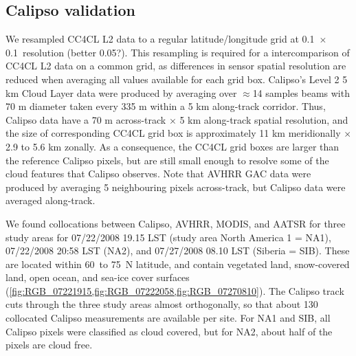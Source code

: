 \subsection{Calipso validation}\label{sec:calipso_method}

We resampled CC4CL L2 data to a regular latitude/longitude grid at 0.1\textdegree\ $\times$ 0.1\textdegree\ resolution (better 0.05?). This resampling is required for a intercomparison of CC4CL L2 data on a common grid, as differences in sensor spatial resolution are reduced when averaging all values available for each grid box. Calipso's Level 2 5 km Cloud Layer data were produced by averaging over $\approx$14 samples beams with 70 m diameter taken every 335 m within a 5 km along-track corridor. Thus, Calipso data have a 70 m across-track $\times$ 5 km along-track spatial resolution, and the size of corresponding CC4CL grid box is approximately 11 km meridionally $\times$ 2.9 to 5.6 km zonally. As a consequence, the CC4CL grid boxes are larger than the reference Calipso pixels, but are still small enough to resolve some of the cloud features that Calipso observes. Note that AVHRR GAC data were produced by averaging 5 neighbouring pixels across-track, but Calipso data were averaged along-track.

We found collocations between Calipso, AVHRR, MODIS, and AATSR for three study areas for 07/22/2008 19.15 LST (study area North America 1 = NA1), 07/22/2008 20:58 LST (NA2), and 07/27/2008 08.10 LST (Siberia = SIB). These are located within 60\textdegree\ to 75\textdegree\ N latitude, and contain vegetated land, snow-covered land, open ocean, and sea-ice cover surfaces (\cref{fig:RGB_07221915,fig:RGB_07222058,fig:RGB_07270810}). The Calipso track cuts through the three study areas almost orthogonally, so that about 130 collocated Calipso measurements are available per site. For NA1 and SIB, all Calipso pixels were classified as cloud covered, but for NA2, about half of the pixels are cloud free.


